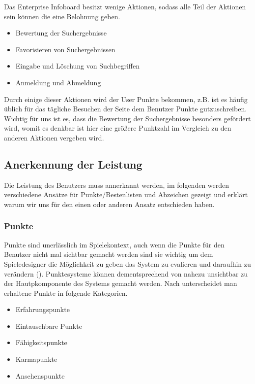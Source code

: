 \documentclass[12pt,twoside]{book}
\begin{document}
Das Enterprise Infoboard besitzt wenige Aktionen, sodass alle Teil der Aktionen sein können die eine Belohnung geben.

\begin{itemize}
  \item Bewertung der Suchergebnisse
  \item Favorisieren von Suchergebnissen
  \item Eingabe und Löschung von Suchbegriffen
  \item Anmeldung und Abmeldung
\end{itemize}

Durch einige dieser Aktionen wird der User Punkte bekommen, z.B. ist es häufig üblich für das tägliche Besuchen der Seite dem Benutzer Punkte gutzuschreiben. Wichtig für uns ist es, dass die Bewertung der Suchergebnisse besonders gefördert wird, womit es denkbar ist hier eine größere Punktzahl im Vergleich zu den anderen Aktionen vergeben wird.

\subsection{Anerkennung der Leistung}

Die Leistung des Benutzers muss annerkannt werden, im folgenden werden verschiedene Ansätze für Punkte/Bestenlisten und Abzeichen gezeigt und erklärt warum wir uns für den einen oder anderen Ansatz entschieden haben.

\subsubsection{Punkte}
Punkte sind unerlässlich im Spielekontext, auch wenn die Punkte für den Benutzer nicht mal sichtbar gemacht werden sind sie wichtig um dem Spieledesigner die Möglichkeit zu geben das System zu evalieren und daraufhin zu verändern (\citep{zichermann2011gamification}). Punktesysteme können dementsprechend von nahezu unsichtbar zu der Hautpkomponente des Systems gemacht werden. Nach \citep{zichermann2011gamification} unterscheidet man erhaltene Punkte in folgende Kategorien.

\begin{itemize}
	\item Erfahrungspunkte
    \item Eintauschbare Punkte
    \item Fähigkeitspunkte
    \item Karmapunkte
    \item Ansehenspunkte
\end{itemize}
\end{document}

